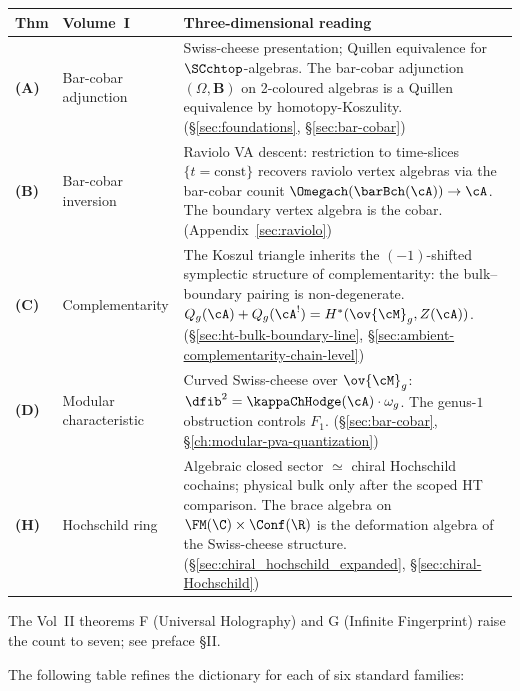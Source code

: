 \begin{center}
\renewcommand{\arraystretch}{1.3}
\begin{tabular}{p{}p{}p{}}
\textbf{Thm} & \textbf{Volume~I} &
 \textbf{Three-dimensional reading} \\
\hline
\textbf{(A)} & Bar-cobar adjunction
 & Swiss-cheese presentation; Quillen equivalence for
 $\SCchtop$-algebras. The bar-cobar adjunction
 $(\Omega, \mathbf{B})$ on 2-coloured algebras is a Quillen
 equivalence by homotopy-Koszulity.
 (\S\ref{sec:foundations}, \S\ref{sec:bar-cobar}) \\[3pt]
\textbf{(B)} & Bar-cobar inversion
 & Raviolo VA descent: restriction to time-slices
 $\{t = \text{const}\}$ recovers raviolo vertex algebras via
 the bar-cobar counit $\Omegach(\barBch(\cA)) \to \cA$. The
 boundary vertex algebra is the cobar.
 (Appendix~\ref{sec:raviolo}) \\[3pt]
\textbf{(C)} & Complementarity
 & The Koszul triangle inherits the
 $(-1)$-shifted symplectic structure of complementarity:
 the bulk--boundary pairing is non-degenerate.
 $Q_g(\cA) + Q_g(\cA^!) = H^*(\ov{\cM}_g, Z(\cA))$.
 (\S\ref{sec:ht-bulk-boundary-line},
 \S\ref{sec:ambient-complementarity-chain-level}) \\[3pt]
\textbf{(D)} & Modular characteristic
 & Curved Swiss-cheese over $\ov{\cM}_g$:
 $\dfib^2 = \kappaChHodge(\cA) \cdot \omega_g$. The
 genus-$1$ obstruction controls $F_1$.
 (\S\ref{sec:bar-cobar},
 \S\ref{ch:modular-pva-quantization}) \\[3pt]
\textbf{(H)} & Hochschild ring
 & Algebraic closed sector $\simeq$ chiral Hochschild cochains;
 physical bulk only after the scoped HT comparison.
 The brace algebra on $\FM(\C) \times \Conf(\R)$ is the
 deformation algebra of the Swiss-cheese structure.
 (\S\ref{sec:chiral_hochschild_expanded},
 \S\ref{sec:chiral-Hochschild})
\end{tabular}
\end{center}

The Vol~II theorems F (Universal Holography) and G (Infinite
Fingerprint) raise the count to seven; see preface \S II.

The following table refines the dictionary for each of six
standard families:

